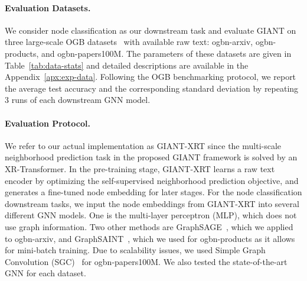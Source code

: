\documentclass{article} \usepackage{iclr2022_conference,times}
\begin{document}
\begin{table}[t!]
\caption{Basic statistics of the OGB benchmark datasets~\citep{hu2020open}.}
\vspace{0.1cm}
\label{tab:data-stats}
\centering
{}
\vspace{-0.15in}
\end{table}

\paragraph{Evaluation Datasets.}
We consider node classification as our downstream task and evaluate GIANT on three large-scale OGB datasets~\citep{hu2020open} with available raw text: ogbn-arxiv, ogbn-products, and ogbn-papers100M. The parameters of these datasets are given in Table~\ref{tab:data-stats} and detailed descriptions are available in the Appendix~\ref{apx:exp-data}. Following the OGB benchmarking protocol, we report the average test accuracy and the corresponding standard deviation by repeating 3 runs of each downstream GNN model.

\paragraph{Evaluation Protocol.}
We refer to our actual implementation as GIANT-XRT since the multi-scale neighborhood prediction task in the proposed GIANT framework is solved by an XR-Transformer. In the pre-training stage, GIANT-XRT learns a raw text encoder by optimizing the self-supervised neighborhood prediction objective, and generates a fine-tuned node embedding for later stages.
For the node classification downstream tasks, we input the node embeddings from GIANT-XRT into several different GNN models. One is the multi-layer perceptron (MLP), which does not use graph information. Two other methods are GraphSAGE~\citep{hamilton2017inductive}, which we applied to ogbn-arxiv, and GraphSAINT~\citep{graphsaint-iclr20}, which we used for ogbn-products as it allows for mini-batch training. Due to scalability issues, we used Simple Graph Convolution (SGC)~\citep{wu2019simplifying} for ogbn-papers100M. We also tested the state-of-the-art GNN for each dataset.
\end{document}
